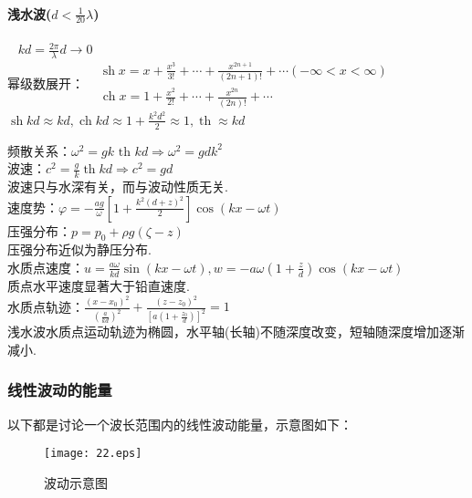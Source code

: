 \documentclass[a4paper,12pt]{article}
\begin{document}
    \paragraph{浅水波($d<\frac{1}{20}\lambda$)}~{}
    $\displaystyle kd=\frac{2\pi}{\lambda}d\rightarrow 0$\\
    幂级数展开：$\displaystyle \begin{aligned} &\operatorname{sh} x=x+\frac{x^{3}}{3 !}+\cdots+\frac{x^{2 n+1}}{(2 n+1) !}+\cdots(-\infty<x<\infty) \\
    &\operatorname{ch} x=1+\frac{x^{2}}{2 !}+\cdots+\frac{x^{2 n}}{(2 n) !}+\cdots\end{aligned}$\\
    $\displaystyle \operatorname{sh}kd\approx kd,\operatorname{ch}kd\approx 1+\frac{k^2 d^2}{2}\approx 1,\operatorname{th}\approx kd$\\
    \begin{spacing}{2}
        频散关系：$\displaystyle \omega^{2}=g k \text { th } k d \Rightarrow \omega^{2}=gd k^2$\\
    波速：$\displaystyle c^{2}=\frac{g}{k} \operatorname{th} k d \Rightarrow c^{2}=gd$\\
    波速只与水深有关，而与波动性质无关.\\
    速度势：$\displaystyle \varphi=-\frac{a g}{\omega}\left[1+\frac{k^{2}(d+z)^{2}}{2}\right] \cos (k x-\omega t)$\\
    压强分布：$p=p_0+\rho g(\zeta-z)$\\
    压强分布近似为静压分布.\\
    水质点速度：$\displaystyle u=\frac{a \omega}{k d} \sin (k x-\omega t) ,   w=-a \omega\left(1+\frac{z}{d}\right) \cos (k x-\omega t)$\\
    质点水平速度显著大于铅直速度.\\
    水质点轨迹：$\displaystyle \frac{\left(x-x_{0}\right)^{2}}{\left(\frac{a}{k d}\right)^{2}}+\frac{\left(z-z_{0}\right)^{2}}{\left[a\left(1+\frac{z_{0}}{d}\right)\right]^{2}}=1$\\
    浅水波水质点运动轨迹为椭圆，水平轴(长轴)不随深度改变，短轴随深度增加逐渐减小.
    \end{spacing}
    \begin{figure}[H]
        \centering 
        \caption*{}
    \end{figure}
    \subsubsection{线性波动的能量}\label{energy}
    以下都是讨论一个波长范围内的线性波动能量，示意图如下：
	\begin{figure}[H]
		\centering\texttt{[image: 22.eps]}
		\caption{波动示意图}\label{fig:2} 
	\end{figure}
\end{document}
